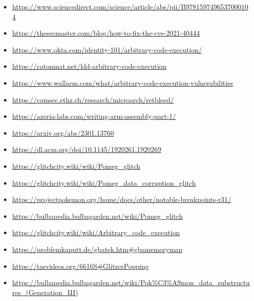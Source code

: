 \documentclass[a4paper]{usiinfbachelorproject}
\begin{document}


\begin{itemize}
	\item \url{https://www.sciencedirect.com/science/article/abs/pii/B9781597496537000104}
	\item \url{https://thesecmaster.com/blog/how-to-fix-the-cve-2021-40444}
	\item \url{https://www.okta.com/identity-101/arbitrary-code-execution/}
	\item \url{https://catonmat.net/ldd-arbitrary-code-execution}
	\item \url{https://www.wallarm.com/what/arbitrary-code-execution-vulnerabilities}
	\item \url{https://comsec.ethz.ch/research/microarch/retbleed/}
	\item \url{https://azeria-labs.com/writing-arm-assembly-part-1/}
	\item \url{https://arxiv.org/abs/2301.13760}
	\item \url{https://dl.acm.org/doi/10.1145/1920261.1920269}
	\item \url{https://glitchcity.wiki/wiki/Pomeg_glitch}
	\item \url{https://glitchcity.wiki/wiki/Pomeg_data_corruption_glitch}
	\item \url{https://projectpokemon.org/home/docs/other/notable-breakpoints-r31/}
	\item \url{https://bulbapedia.bulbagarden.net/wiki/Pomeg_glitch}
	\item \url{https://glitchcity.wiki/wiki/Arbitrary_code_execution}
	\item \url{https://problemkaputt.de/gbatek.htm#gbamemorymap}
	\item \url{https://tasvideos.org/6616S#GlitzerPopping}
	\item \url{https://bulbapedia.bulbagarden.net/wiki/Pok\%C3\%A9mon_data_substructures_(Generation\_III)}
\end{itemize}
\end{document}
